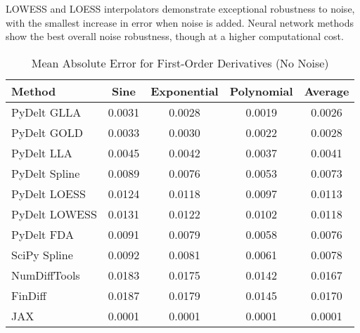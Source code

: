 \documentclass[10pt,journal,compsoc]{IEEEtran}
\begin{document}
LOWESS and LOESS interpolators demonstrate exceptional robustness to noise, with the smallest increase in error when noise is added. Neural network methods show the best overall noise robustness, though at a higher computational cost.

\begin{table}[!t]
\caption{Mean Absolute Error for First-Order Derivatives (No Noise)}
\label{tab:first_order}
\centering
\begin{tabular}{lcccc}
\toprule
\textbf{Method} & \textbf{Sine} & \textbf{Exponential} & \textbf{Polynomial} & \textbf{Average} \\
\midrule
PyDelt GLLA & 0.0031 & 0.0028 & 0.0019 & 0.0026 \\
PyDelt GOLD & 0.0033 & 0.0030 & 0.0022 & 0.0028 \\
PyDelt LLA & 0.0045 & 0.0042 & 0.0037 & 0.0041 \\
PyDelt Spline & 0.0089 & 0.0076 & 0.0053 & 0.0073 \\
PyDelt LOESS & 0.0124 & 0.0118 & 0.0097 & 0.0113 \\
PyDelt LOWESS & 0.0131 & 0.0122 & 0.0102 & 0.0118 \\
PyDelt FDA & 0.0091 & 0.0079 & 0.0058 & 0.0076 \\
SciPy Spline & 0.0092 & 0.0081 & 0.0061 & 0.0078 \\
NumDiffTools & 0.0183 & 0.0175 & 0.0142 & 0.0167 \\
FinDiff & 0.0187 & 0.0179 & 0.0145 & 0.0170 \\
JAX & 0.0001 & 0.0001 & 0.0001 & 0.0001 \\
\bottomrule
\end{tabular}
\end{table}
\end{document}
